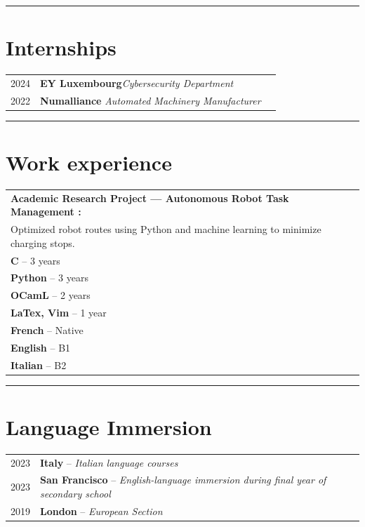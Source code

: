 \documentclass[11pt, a4paper]{article}
\begin{document}
\rule{\textwidth}{0.4pt}  %



\section*{Internships}

\begin{tabularx}{\textwidth}{@{}l X r@{}}
    2024 & \textbf{EY Luxembourg}\quad \textit{Cybersecurity Department}
    \\
    2022 & \textbf{Numalliance} \quad \textit{Automated Machinery Manufacturer}
\end{tabularx}

\rule{\textwidth}{0.4pt}  %

\section*{Work experience}

\begin{tabularx}{\textwidth}{@{}l X r@{}}
    \textbf{Academic Research Project — Autonomous Robot Task Management :}
    \\
    \small Optimized robot routes using Python and machine learning to minimize charging stops.
    \\[0.3em]
    \textbf{C} -- 3 years
    \\
    \textbf{Python} -- 3 years
    \\
    \textbf{OCamL} -- 2 years
    \\
    \textbf{LaTex, Vim} -- 1 year
    \\
    \textbf{French} -- Native
    \\
    \textbf{English} -- B1
    \\
    \textbf{Italian} -- B2
\end{tabularx}

\rule{\textwidth}{0.4pt}  %

\section*{Language Immersion}

\begin{tabularx}{\textwidth}{@{}l X r@{}}
    2023 & \textbf{Italy} -- \textit{Italian language courses}
    \\
    2023 & \textbf{San Francisco} -- \textit{English-language immersion during final year of secondary school}
    \\
    2019 & \textbf{London} -- \textit{European Section}
\end{tabularx}
\end{document}
